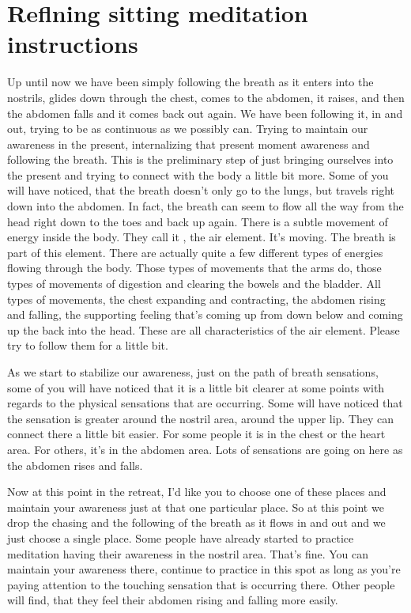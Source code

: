 \documentclass[letterpaper,10pt,english]{sphinxmanual}
\begin{document}
\section{Reflning sitting meditation instructions}
\label{\detokenize{2-a:reflning-sitting-meditation-instructions}}
\sphinxAtStartPar
Up  until  now  we  have  been  simply  following  the  breath  as  it  enters
into the nostrils, glides down through the chest, comes to the abdomen, it
raises,  and  then  the  abdomen  falls  and  it  comes  back  out  again.  We  have
been following it, in and out, trying to be as continuous as we possibly can.
Trying to maintain our awareness in the present, internalizing that present
moment awareness and following the breath. This is the preliminary step of
just bringing ourselves into the present and trying to connect with the body
a little bit more. Some of you will have noticed, that the breath doesn’t only
go to the lungs, but travels right down into the abdomen. In fact, the breath
can seem to flow all the way from the head right down to the toes and back
  up again. There is a subtle movement of energy inside the body. They call it
, the air element. It’s moving. The breath is part of this element.
There are actually quite a few different types of energies flowing through the
body. Those types of movements that the arms do, those types of movements
of  digestion  and  clearing  the  bowels  and  the  bladder. All  types  of  movements, the chest expanding and contracting, the abdomen rising and falling,
the supporting feeling that’s coming up from down below and coming up the
back into the head. These are all characteristics of the air element. Please try
to follow them for a little bit.

\sphinxAtStartPar
As we start to stabilize our awareness, just on the path of breath sensations, some of you will have noticed that it is a little bit clearer at some
points with regards to the physical sensations that are occurring. Some will
have noticed that the sensation is greater around the nostril area, around the
upper lip. They can connect there a little bit easier. For some people it is in
the chest or the heart area. For others, it’s in the abdomen area. Lots of sensations are going on here as the abdomen rises and falls.

\sphinxAtStartPar
Now  at  this  point  in  the  retreat,  I’d  like  you  to  choose  one  of  these
places and maintain your awareness just at that one particular place. So at
this point we drop the chasing and the following of the breath as it flows in
and out and we just choose a single place. Some people have already started
to practice meditation having their awareness in the nostril area. That’s fine.
You can maintain your awareness there, continue to practice in this spot as
long  as  you’re  paying  attention  to  the  touching  sensation  that  is  occurring
there. Other people will find, that they feel their abdomen rising and falling
more easily.
\end{document}
